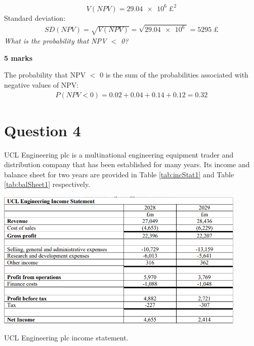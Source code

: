 \begin{equation}
    V\left(NPV\right) = \SI{29.04e6}{\pounds^2}
\end{equation}
Standard deviation:
\begin{gather}
    SD\left(NPV\right) = \sqrt{V\left(NPV\right)} = \sqrt{\SI{29.04e6}{}} = \SI{5295}{\pounds}
\end{gather}
\textit{What is the probability that NPV $<$ 0?}

\textbf{5 marks}

The probability that NPV $<$ 0 is the sum of the probabilities associated with negative values of NPV:
\begin{gather}
    P\left(NPV < 0\right) = 0.02 + 0.04 + 0.14 + 0.12 = 0.32
\end{gather}
\section{Question 4}
UCL Engineering plc is a multinational engineering equipment trader and distribution company that has been established for many years. Its income and balance sheet for two years are provided in Table \ref{tab:incStat1} and Table \ref{tab:balSheet1} respectively.
\begin{table}[H]
    \centering
    \includegraphics[width = 0.9\textwidth]{img/figure66.png}
    \caption{UCL Engineering plc income statement.}
    \label{tab:incStat1}
\end{table}
